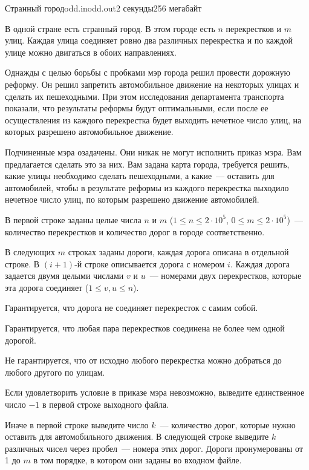 \begin{problem}{Странный город}{odd.in}{odd.out}{2 секунды}{256 мегабайт}


В одной стране есть странный город. 
В этом городе есть $n$ перекрестков и $m$ улиц. Каждая улица 
соединяет ровно два различных перекрестка и по каждой улице можно двигаться в обоих направлениях.

Однажды с целью борьбы с пробками мэр города решил провести дорожную реформу. 
Он решил запретить автомобильное движение на некоторых улицах и сделать их пешеходными.
При этом исследования департамента транспорта показали, что результаты реформы
будут оптимальными, если после ее осуществления из каждого перекрестка будет выходить 
нечетное число улиц, на которых разрешено автомобильное движение.

Подчиненные мэра озадачены. Они никак не могут исполнить приказ мэра. 
Вам предлагается сделать это за них. Вам задана карта города, требуется решить, какие
улицы необходимо сделать пешеходными, а какие~--- оставить для автомобилей, 
чтобы в результате реформы из каждого перекрестка
выходило нечетное число улиц, по которым разрешено движение автомобилей.

\InputFile
В первой строке заданы целые числа $n$ и $m$ 
($1 \le n \le 2 \cdot 10^5$, $0 \le m \le 2 \cdot 10^5$)~--- количество перекрестков 
и количество дорог в городе соответственно.

В следующих $m$ строках заданы дороги, каждая дорога описана в отдельной строке. 
В $(i+1)$-й строке описывается дорога с номером $i$. 
Каждая дорога задается двумя целыми числами $v$ и $u$~--- 
номерами двух перекрестков, которые эта дорога соединяет ($1 \le v, u \le n$).

Гарантируется, что дорога не соединяет перекресток с самим собой.

Гарантируется, что любая пара перекрестков соединена не более чем одной дорогой.

Не гарантируется, что от исходно любого перекрестка можно добраться до любого другого по улицам.

\OutputFile
Если удовлетворить условие в приказе мэра невозможно, выведите 
единственное число $-1$ в первой строке выходного файла.

Иначе в первой строке выведите число $k$~--- количество дорог, которые нужно оставить для
автомобильного движения.
В следующей строке выведите $k$ различных чисел через пробел~--- номера этих дорог. 
Дороги пронумерованы от 1 до $m$ в том порядке, в котором они заданы во входном файле.

\Examples
\begin{example}%
%
%
%
\end{example}

\end{problem}

